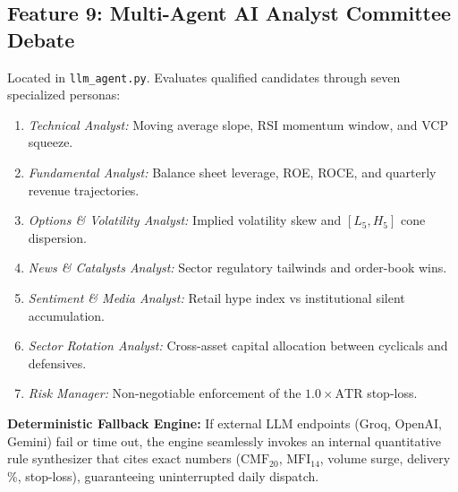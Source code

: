 \documentclass[11pt,a4paper]{article}
\begin{document}
\subsection{Feature 9: Multi-Agent AI Analyst Committee Debate}
Located in \texttt{llm\_agent.py}. Evaluates qualified candidates through seven specialized personas:
\begin{enumerate}[leftmargin=*]
    \item \textit{Technical Analyst:} Moving average slope, RSI momentum window, and VCP squeeze.
    \item \textit{Fundamental Analyst:} Balance sheet leverage, ROE, ROCE, and quarterly revenue trajectories.
    \item \textit{Options \& Volatility Analyst:} Implied volatility skew and $[L_5, H_5]$ cone dispersion.
    \item \textit{News \& Catalysts Analyst:} Sector regulatory tailwinds and order-book wins.
    \item \textit{Sentiment \& Media Analyst:} Retail hype index vs institutional silent accumulation.
    \item \textit{Sector Rotation Analyst:} Cross-asset capital allocation between cyclicals and defensives.
    \item \textit{Risk Manager:} Non-negotiable enforcement of the $1.0\times \text{ATR}$ stop-loss.
\end{enumerate}
\textbf{Deterministic Fallback Engine:} If external LLM endpoints (Groq, OpenAI, Gemini) fail or time out, the engine seamlessly invokes an internal quantitative rule synthesizer that cites exact numbers ($\text{CMF}_{20}$, $\text{MFI}_{14}$, volume surge, delivery \%, stop-loss), guaranteeing uninterrupted daily dispatch.
\end{document}
